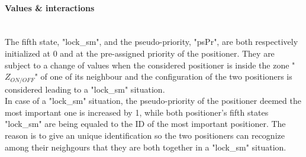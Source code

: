 \documentclass[]{spie}  %
\begin{document}
	\paragraph{Values \& interactions}\mbox{}\\
	The fifth state, "lock\_sm", and the pseudo-priority, "psPr", are both respectively initialized at 0 and at the pre-assigned priority of the positioner. They are subject to a change of values when the considered positioner is inside the zone "$Z_{ON/OFF}$" of one of its neighbour and the configuration of the two positioners is considered leading to a "lock\_sm" situation. \\
	In case of a "lock\_sm" situation, the pseudo-priority of the positioner deemed the most important one is increased by 1, while both positioner's fifth states "lock\_sm" are being equaled to the ID of the most important positioner. The reason is to give an unique identification so the two positioners can recognize among their neighgours that they are both together in a "lock\_sm" situation.\\ 
	
\end{document}
